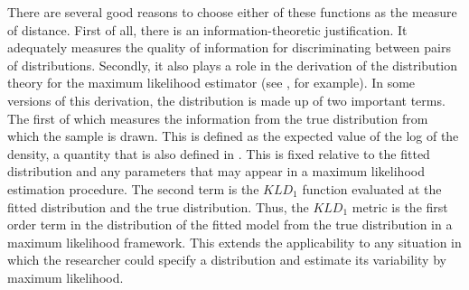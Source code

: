 There are several good reasons to choose either of these functions as the measure of distance.
%
First of all, there is an information-theoretic justification.
It adequately measures the quality of information for discriminating between pairs of distributions.
Secondly, it also plays a role in the derivation of the distribution theory for the maximum likelihood estimator (see \citet{amemiya1985}, for example).
In some versions of this derivation, the distribution is made up of two important terms.
The first of which measures the information from the true distribution from which the sample is drawn.
This is defined as the expected value of the log of the density, a quantity that is also defined in \citet{kullbackliebler1951}.
This is fixed relative to the fitted distribution and any parameters that may appear in a maximum likelihood estimation procedure.
The second term is the $KLD_1$ function evaluated at the fitted distribution and the true distribution.
Thus, the $KLD_1$ metric is the first order term in the distribution of the fitted model from the true distribution in a maximum likelihood framework.
%
This extends the applicability to any situation in which the researcher could specify a distribution and estimate its variability by maximum likelihood.







